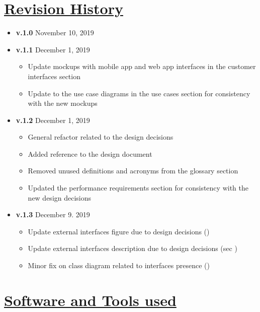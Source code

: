 \begin{appendices}
	\section[Revision History]{\hyperlink{toc}{Revision History}}
		\label{sec:revisionHistory}
		
		\begin{itemize}
			\item \textbf{v.1.0} November 10, 2019
			\item \textbf{v.1.1} December 1, 2019
				\begin{itemize}
					\item Update mockups with mobile app and web app interfaces in the customer interfaces section 
					\item Update to the use case diagrams in the use cases section  for consistency with the new mockups
				\end{itemize}
			\item \textbf{v.1.2} December 1, 2019
				\begin{itemize}
					\item General refactor related to the design decisions
					\item Added reference to the design document \cite{DD}
					\item Removed unused definitions and acronyms from the glossary section 
					\item Updated the performance requirements section  for consistency with the new design decisions
				\end{itemize}
			\item \textbf{v.1.3} December 9. 2019
				\begin{itemize}
					\item Update external interfaces figure due to design decisions ()
					\item Update external interfaces description due to design decisions (sec )
					\item Minor fix on class diagram related to interfaces presence ()
				\end{itemize}
		\end{itemize}
	
	\section[Software and Tools used]{\hyperlink{toc}{Software and Tools used}}
		\label{sec:softwareAndTools}
		

\end{appendices}

